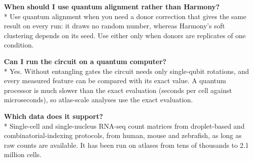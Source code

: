 \documentclass[11pt]{article}
\begin{document}
\textbf{When should I use quantum alignment rather than Harmony?}\\*
Use quantum alignment when you need a donor correction that gives the same result on every run: it draws no random number, whereas Harmony's soft clustering depends on its seed. Use either only when donors are replicates of one condition.

\textbf{Can I run the circuit on a quantum computer?}\\*
Yes. Without entangling gates the circuit needs only single-qubit rotations, and every measured feature can be compared with its exact value. A quantum processor is much slower than the exact evaluation (seconds per cell against microseconds), so atlas-scale analyses use the exact evaluation.

\textbf{Which data does it support?}\\*
Single-cell and single-nucleus RNA-seq count matrices from droplet-based and combinatorial-indexing protocols, from human, mouse and zebrafish, as long as raw counts are available. It has been run on atlases from tens of thousands to 2.1 million cells.
\end{document}
